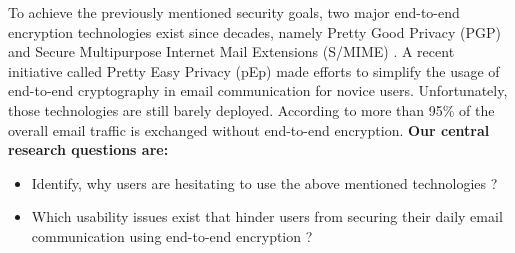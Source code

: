 To achieve the previously mentioned security goals, two major end-to-end encryption technologies exist since decades, namely Pretty Good Privacy (PGP) \cite{rfc1991} and Secure Multipurpose Internet Mail Extensions (S/MIME) \cite{rfc2633}. A recent initiative called Pretty Easy Privacy (pEp) \cite{pEp} made efforts to simplify the usage of end-to-end cryptography in email communication for novice users. Unfortunately, those technologies are still barely deployed. According to \cite{secureEmail} more than 95\% of the overall email traffic is exchanged without end-to-end encryption.
\newline
\newline
\textbf{Our central research questions are:}
\begin{itemize}
	\item Identify, why users are hesitating to use the above mentioned technologies ?
	\item Which usability issues exist that hinder users from securing their daily email communication using end-to-end encryption ?
\end{itemize}

